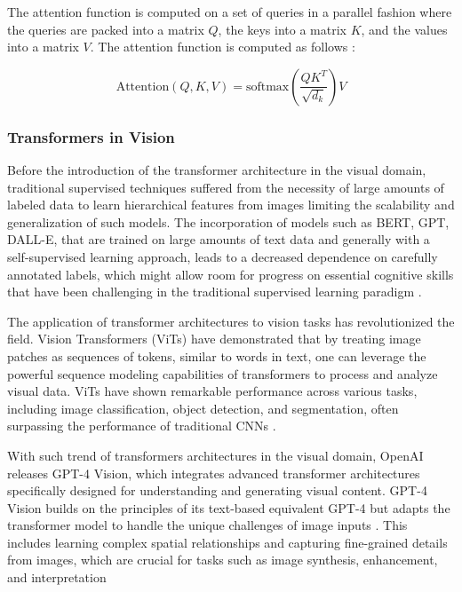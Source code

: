 \documentclass[english, 12pt, a4paper, elec, utf8, a-2b, online]{aaltothesis}
\begin{document}
The attention function is computed on a set of queries in a parallel fashion where the queries are packed into a matrix $Q$, the keys into a matrix $K$, and the values into a matrix $V$.
The attention function is computed as follows \cite{Vaswani2017}:

\begin{equation}
    \text{Attention}(Q, K, V) = \text{softmax}\left(\frac{QK^T}{\sqrt{d_k}}\right)V
\end{equation}

\subsubsection{Transformers in Vision}

Before the introduction of the transformer architecture in the visual domain, traditional supervised techniques suffered from the necessity of large amounts of labeled data to learn hierarchical features from images limiting the scalability and generalization of such models.
The incorporation of models such as BERT, GPT, DALL-E, that are trained on large amounts of text data and generally with a self-supervised learning approach, leads to a decreased dependence on carefully annotated labels, which might allow room for progress on essential cognitive skills that have been challenging in the traditional supervised learning paradigm \cite{Bommasani2021, Zellers2019, Martin2023}.

The application of transformer architectures to vision tasks has revolutionized the field.
Vision Transformers (ViTs) have demonstrated that by treating image patches as sequences of tokens, similar to words in text, one can leverage the powerful sequence modeling capabilities of transformers to process and analyze visual data.
ViTs have shown remarkable performance across various tasks, including image classification, object detection, and segmentation, often surpassing the performance of traditional \ac{CNN}s \cite{Dosovitskiy2021}.

With such trend of transformers architectures in the visual domain, OpenAI releases GPT-4 Vision, which integrates advanced transformer architectures specifically designed for understanding and generating visual content.
GPT-4 Vision builds on the principles of its text-based equivalent GPT-4 but adapts the transformer model to handle the unique challenges of image inputs \cite{2023GPT4VisionSC}.
This includes learning complex spatial relationships and capturing fine-grained details from images, which are crucial for tasks such as image synthesis, enhancement, and interpretation
\end{document}
